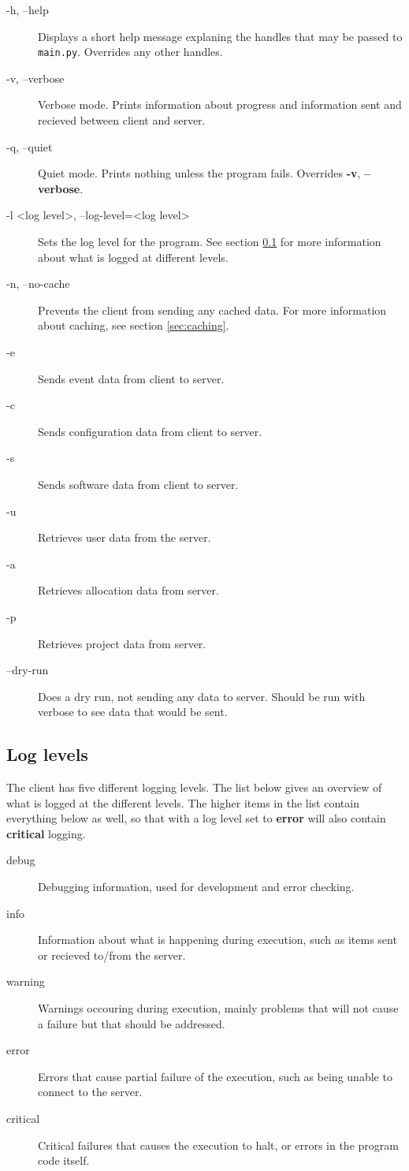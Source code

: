 \documentclass[titlepage, a4paper,10pt]{article}
\begin{document}
\begin{description}
    \item[-h, --help]   Displays a short help message explaning the handles
    that may be passed to \texttt{main.py}. Overrides any other handles.
    \item[-v, --verbose]    Verbose mode. Prints information about progress and
    information sent and recieved between client and server. 
    \item[-q, --quiet]  Quiet mode. Prints nothing unless the program fails.
    Overrides \textbf{-v}, \textbf{--verbose}.
    \item[-l \textless log level\textgreater, --log-level=\textless log
    level\textgreater] Sets the log level for the program. See section 
    \ref{sec:loglevels} for more information about what is logged at different 
    levels.
    \item[-n, --no-cache]   Prevents the client from sending any cached data.
    For more information about caching, see section \ref{sec:caching}.
    \item[-e]   Sends event data from client to server.
    \item[-c]   Sends configuration data from client to server.
    \item[-s]   Sends software data from client to server.
    \item[-u]   Retrieves user data from the server.
    \item[-a]   Retrieves allocation data from server.
    \item[-p]   Retrieves project data from server.
    \item[--dry-run]    Does a dry run, not sending any data to server. Should
    be run with verbose to see data that would be sent.
\end{description}

\subsection{Log levels}
\label{sec:loglevels}
The client has five different logging levels. The list below gives an overview
of what is logged at the different levels. The higher items in the list contain
everything below as well, so that with a log level set to \textbf{error} will
also contain \textbf{critical} logging.

\begin{description}
    \item[debug]    Debugging information, used for development and error
    checking.
    \item[info] Information about what is happening during execution, such as
    items sent or recieved to/from the server.
    \item[warning]  Warnings occouring during execution, mainly problems that
    will not cause a failure but that should be addressed.
    \item[error]    Errors that cause partial failure of the execution, such as
    being unable to connect to the server.
    \item[critical] Critical failures that causes the execution to halt, or
    errors in the program code itself.
\end{description}
\end{document}
